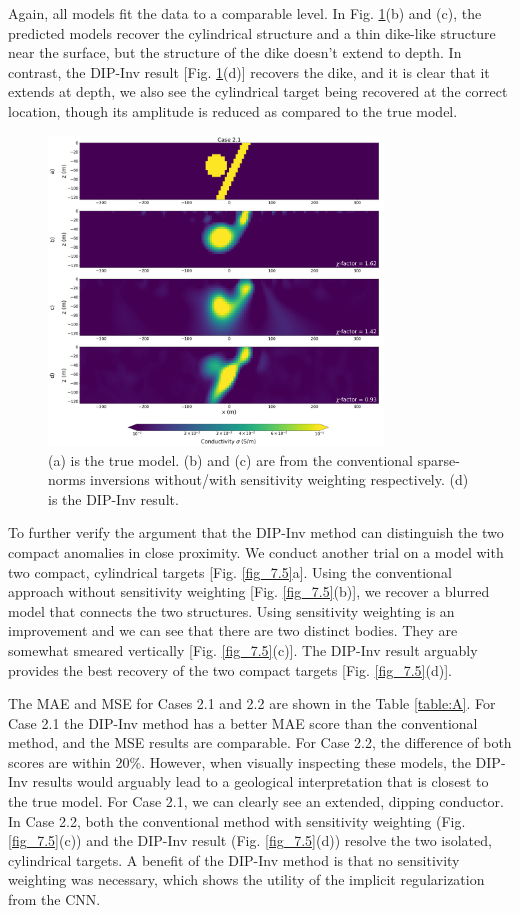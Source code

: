 \documentclass[lettersize,journal]{IEEEtran}
\begin{document}
Again, all models fit the data to a comparable level. In Fig. \ref{fig3_5}(b) and (c), the predicted models recover the cylindrical structure and a thin dike-like structure near the surface, but the structure of the dike doesn't extend to depth. In contrast, the DIP-Inv result [Fig. \ref{fig3_5}(d)] recovers the dike, and it is clear that it extends at depth, we also see the cylindrical target being recovered at the correct location, though its amplitude is reduced as compared to the true model. 

\begin{figure}[h!]
\centering
\includegraphics[width=3.5in]{Figures/xu9.png}
\caption{(a) is the true model. (b) and (c) are from the conventional sparse-norms inversions without/with sensitivity weighting respectively. (d) is the DIP-Inv result.}
\label{fig3_5}
\end{figure}

To further verify the argument that the DIP-Inv method can distinguish the two compact anomalies in close proximity. We conduct another trial on a model with two compact, cylindrical targets [Fig. \ref{fig_7.5}a]. 
Using the conventional approach without sensitivity weighting [Fig. \ref{fig_7.5}(b)], we recover a blurred model that connects the two structures. Using sensitivity weighting is an improvement and we can see that there are two distinct bodies. They are somewhat smeared vertically [Fig. \ref{fig_7.5}(c)]. The DIP-Inv result arguably provides the best recovery of the two compact targets [Fig. \ref{fig_7.5}(d)]. 

The MAE and MSE for Cases 2.1 and 2.2 are shown in the Table \ref{table:A}. For Case 2.1 the DIP-Inv method has a better MAE score than the conventional method, and the MSE results are comparable. For Case 2.2, the difference of both scores are within 20$\%$. However, when visually inspecting these models, the DIP-Inv results would arguably lead to a geological interpretation that is closest to the true model. For Case 2.1, we can clearly see an extended, dipping conductor. In Case 2.2, both the conventional method with sensitivity weighting (Fig. \ref{fig_7.5}(c)) and the DIP-Inv result (Fig. \ref{fig_7.5}(d)) resolve the two isolated, cylindrical targets. A benefit of the DIP-Inv method is that no sensitivity weighting was necessary, which shows the utility of the implicit regularization from the CNN. 
\end{document}
